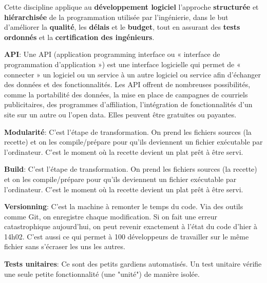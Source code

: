 \noindent Cette discipline applique au \textbf{développement logiciel} l'approche \textbf{structurée} et \textbf{hiérarchisée} de la programmation utilisée par l'ingénierie, dans le but d'améliorer la \textbf{qualité}, les \textbf{délais} et le \textbf{budget}, tout en assurant des \textbf{tests ordonnés} et la \textbf{certification des ingénieurs}.

\vspace{0.5cm}

\noindent \textbf{API}: Une API (application programming interface ou « interface de programmation d’application ») est une interface logicielle qui permet de « connecter » un logiciel ou un service à un autre logiciel ou service afin d’échanger des données et des fonctionnalités. Les API offrent de nombreuses possibilités, comme la portabilité des données, la mise en place de campagnes de courriels publicitaires, des programmes d’affiliation, l’intégration de fonctionnalités d’un site sur un autre ou l’open data. Elles peuvent être gratuites ou payantes.

\vspace{0.5cm}

\noindent \textbf{Modularité}: C'est l'étape de transformation. On prend les fichiers sources (la recette) et on les compile/prépare pour qu'ils deviennent un fichier exécutable par l'ordinateur. C'est le moment où la recette devient un plat prêt à être servi.

\vspace{0.5cm}

\noindent \textbf{Build}: C'est l'étape de transformation. On prend les fichiers sources (la recette) et on les compile/prépare pour qu'ils deviennent un fichier exécutable par l'ordinateur. C'est le moment où la recette devient un plat prêt à être servi.

\vspace{0.5cm}

\noindent \textbf{Versionning}: C'est la machine à remonter le temps du code. Via des outils comme Git, on enregistre chaque modification. Si on fait une erreur catastrophique aujourd'hui, on peut revenir exactement à l'état du code d'hier à 14h02. C'est aussi ce qui permet à 100 développeurs de travailler sur le même fichier sans s'écraser les uns les autres.

\vspace{0.5cm}

\noindent \textbf{Tests unitaires}: Ce sont des petits gardiens automatisés. Un test unitaire vérifie une seule petite fonctionnalité (une "unité") de manière isolée.

